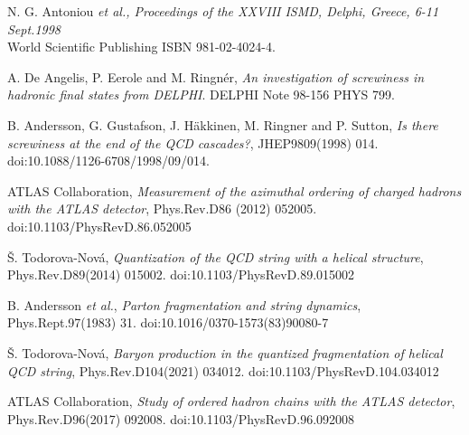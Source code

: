 \documentclass[Physsubmission, Phys]{SciPost}
\begin{document}
\begin{thebibliography}{}
%
%
N. G. Antoniou {\it et al., Proceedings of the XXVIII ISMD,
 Delphi, Greece, 6-11 Sept.1998}  \\
  World Scientific Publishing ISBN 981-02-4024-4.

A. De Angelis, P. Eerole and M. Ringn\'{e}r, {\it  An investigation of screwiness in hadronic final states from DELPHI}.
  DELPHI Note 98-156 PHYS 799.

 B. Andersson, G. Gustafson, J. H\"{a}kkinen, M. Ringner and P. Sutton,
 \textit {Is there screwiness at the end of the QCD cascades?},
 JHEP9809(1998) 014. 
  doi:10.1088/1126-6708/1998/09/014.

ATLAS Collaboration, \textit{Measurement of the azimuthal ordering of
  charged hadrons with the
  ATLAS detector}, Phys.Rev.D86 (2012) 052005.   doi:10.1103/PhysRevD.86.052005

\v{S}. Todorova-Nov\'{a}, \textit{Quantization of the QCD string with
  a helical structure}, Phys.Rev.D89(2014) 015002.   doi:10.1103/PhysRevD.89.015002

B. Andersson \textit{et al.}, \textit{Parton fragmentation and string
  dynamics}, Phys.Rept.97(1983) 31.   doi:10.1016/0370-1573(83)90080-7

\v{S}. Todorova-Nov\'{a}, \textit{Baryon production in the quantized
  fragmentation of helical QCD string}, Phys.Rev.D104(2021) 034012. 
 doi:10.1103/PhysRevD.104.034012 

ATLAS Collaboration, \textit{Study of ordered hadron chains with the
  ATLAS detector}, Phys.Rev.D96(2017) 092008.    doi:10.1103/PhysRevD.96.092008
\end{thebibliography}





%

\nolinenumbers
\end{document}
